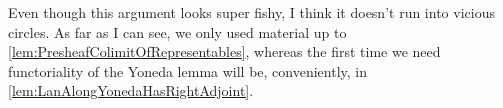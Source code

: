 \begin{numpar}
	Even though this argument looks super fishy, I think it doesn't run into vicious circles. As far as I can see, we only used material up to \cref{lem:PresheafColimitOfRepresentables}, whereas the first time we need functoriality of the Yoneda lemma will be, conveniently, in \cref{lem:LanAlongYonedaHasRightAdjoint}.
\end{numpar}



